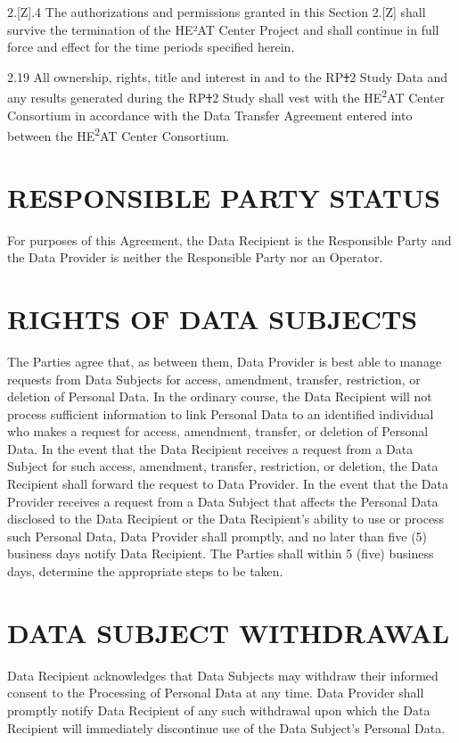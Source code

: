 \documentclass[12pt,letterpaper]{article}
\newcommand{\deleted}[1]{\textcolor{deletecolor}{\sout{#1}}}
\newcommand{\added}[1]{\textcolor{addcolor}{#1}}
\begin{document}
\added{2.[Z].4 The authorizations and permissions granted in this Section 2.[Z] shall survive the termination of the HE²AT Center Project and shall continue in full force and effect for the time periods specified herein.}

2.19 All ownership, rights, title and interest in and to the RP\deleted{1}\added{2} Study Data and any results generated during the RP\deleted{1}\added{2} Study shall vest with the HE\textsuperscript{2}AT Center Consortium in accordance with the Data Transfer Agreement entered into between the HE\textsuperscript{2}AT Center Consortium.

\section{RESPONSIBLE PARTY STATUS}

For purposes of this Agreement, the Data Recipient is the Responsible Party and the Data Provider is neither the Responsible Party nor an Operator.

\section{RIGHTS OF DATA SUBJECTS}

The Parties agree that, as between them, Data Provider is best able to manage requests from Data Subjects for access, amendment, transfer, restriction, or deletion of Personal Data. In the ordinary course, the Data Recipient will not process sufficient information to link Personal Data to an identified individual who makes a request for access, amendment, transfer, or deletion of Personal Data. In the event that the Data Recipient receives a request from a Data Subject for such access, amendment, transfer, restriction, or deletion, the Data Recipient shall forward the request to Data Provider. In the event that the Data Provider receives a request from a Data Subject that affects the Personal Data disclosed to the Data Recipient or the Data Recipient's ability to use or process such Personal Data, Data Provider shall promptly, and no later than five (5) business days notify Data Recipient. The Parties shall within 5 (five) business days, determine the appropriate steps to be taken.

\section{DATA SUBJECT WITHDRAWAL}

Data Recipient acknowledges that Data Subjects may withdraw their informed consent to the Processing of Personal Data at any time. Data Provider shall promptly notify Data Recipient of any such withdrawal upon which the Data Recipient will immediately discontinue use of the Data Subject's Personal Data.
\end{document}
